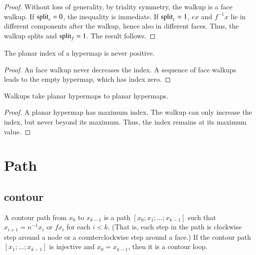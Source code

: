 \begin{proof} Without loss of generality, by triality symmetry, the
walkup is a face walkup.  If ${\operatorname{split}}_c=0$, the inequality is
immediate.  If ${\operatorname{split}}_c=1$, $e x$ and $f^{-1} x$ lie in
different components after the walkup, hence also in different
faces.  Thus, the walkup splits and ${\operatorname{split}}_f = 1$.  The result
follows.
\end{proof}


\begin{lemma}  
The planar index
of a hypermap is never positive.
\end{lemma}

\begin{proof}  An face walkup never decreases the index.  A sequence
of face walkups leads to the empty hypermap, which has
index zero.
\end{proof}


\begin{lemma}
Walkups take planar hypermaps to planar
hypermaps.
\end{lemma}

\begin{proof}  
A planar hypermap has maximum index.  The walkup
can only increase the index, but never beyond its maximum.  
Thus, the index remains at its maximum value.
\end{proof}





\section{Path}

\subsection{contour}

\begin{definition} A contour path from
$x_0$ to $x_{k-1}$ is a path $[x_0;x_1;\ldots;x_{k-1}]$ such that
$x_{i+1} = n^{-1} x_i$ or $f x_i$ for each $i<k$.  (That is, each
step in the path is clockwise step around a node or a
counterclockwise step around a face.)  If the contour path
$[x_1;\ldots;x_{k-1}]$ is injective and $x_0 = x_{k-1}$, then it is
a contour loop.  %
%
%
\end{definition}

